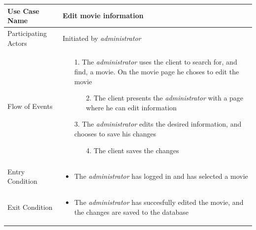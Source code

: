 \begin{center}
	\begin{tabular}{ | l | p{10cm} |  }
		 \hline
		Use Case Name & Edit movie information \\ \hline
		Participating Actors & Initiated by \emph{administrator} \\ \hline
		Flow of Events & \begin{enumerate}
						\item[1.] The \emph{administrator} uses the client to search for, and find, a movie. On the movie page he choses to edit the movie
						\begin{enumerate}
							\item[2.] The client presents the \emph{administrator} with a page where he can edit information
						\end{enumerate}
						\item[3.] The \emph{administrator} edits the desired information, and chooses to save his changes
						\begin{enumerate}
							\item[4.] The client saves the changes
						\end{enumerate}
					\end{enumerate} \\ \hline
		Entry Condition & \begin{itemize}
						\item The \emph{administrator} has logged in and has selected a movie
					\end{itemize} \\ \hline
		Exit Condition & \begin{itemize}
						\item The \emph{administrator} has succesfully edited the movie, and the changes are saved to the database
					\end{itemize} \\
		\hline
	\end{tabular}
\end{center}

